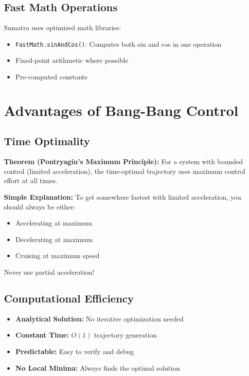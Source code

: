 \documentclass[12pt,a4paper]{article}
\begin{document}
\subsection{Fast Math Operations}

Sumatra uses optimized math libraries:
\begin{itemize}
    \item \texttt{FastMath.sinAndCos()}: Computes both sin and cos in one operation
    \item Fixed-point arithmetic where possible
    \item Pre-computed constants
\end{itemize}

\section{Advantages of Bang-Bang Control}

\subsection{Time Optimality}

\textbf{Theorem (Pontryagin's Maximum Principle):}
For a system with bounded control (limited acceleration), the time-optimal trajectory uses maximum control effort at all times.

\textbf{Simple Explanation:}
To get somewhere fastest with limited acceleration, you should always be either:
\begin{itemize}
    \item Accelerating at maximum
    \item Decelerating at maximum
    \item Cruising at maximum speed
\end{itemize}
Never use partial acceleration!

\subsection{Computational Efficiency}

\begin{itemize}
    \item \textbf{Analytical Solution:} No iterative optimization needed
    \item \textbf{Constant Time:} $O(1)$ trajectory generation
    \item \textbf{Predictable:} Easy to verify and debug
    \item \textbf{No Local Minima:} Always finds the optimal solution
\end{itemize}
\end{document}
